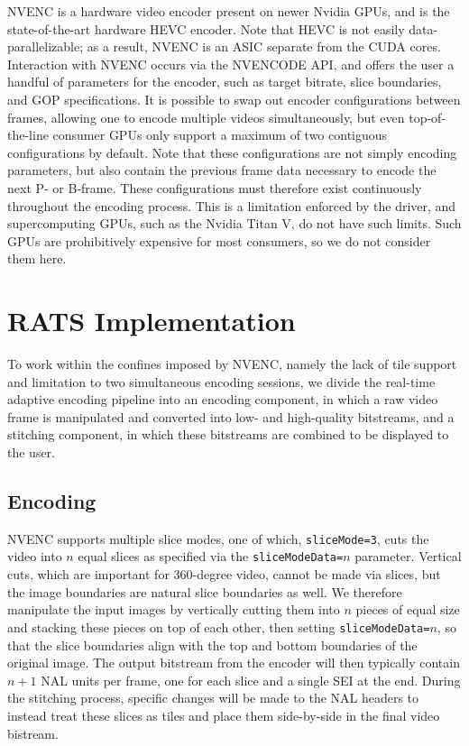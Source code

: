 NVENC is a hardware video encoder present on newer Nvidia GPUs, and is the state-of-the-art hardware HEVC encoder. Note that HEVC is not easily data-parallelizable; as a result, NVENC is an ASIC separate from the CUDA cores. Interaction with NVENC occurs via the NVENCODE API, and offers the user a handful of parameters for the encoder, such as target bitrate, slice boundaries, and GOP specifications. It is possible to swap out encoder configurations between frames, allowing one to encode multiple videos simultaneously, but even top-of-the-line consumer GPUs only support a maximum of two contiguous configurations by default. Note that these configurations are not simply encoding parameters, but also contain the previous frame data necessary to encode the next P- or B-frame. These configurations must therefore exist continuously throughout the encoding process. This is a limitation enforced by the driver, and supercomputing GPUs, such as the Nvidia Titan V, do not have such limits. Such GPUs are prohibitively expensive for most consumers, so we do not consider them here.

\section{RATS Implementation}
To work within the confines imposed by NVENC, namely the lack of tile support and limitation to two simultaneous encoding sessions, we divide the real-time adaptive encoding pipeline into an encoding component, in which a raw video frame is manipulated and converted into low- and high-quality bitstreams, and a stitching component, in which these bitstreams are combined to be displayed to the user.

\subsection{Encoding}
NVENC supports multiple slice modes, one of which, \texttt{sliceMode=3}, cuts the video into $n$ equal slices as specified via the \texttt{sliceModeData=}$n$ parameter. Vertical cuts, which are important for 360-degree video, cannot be made via slices, but the image boundaries are natural slice boundaries as well. We therefore manipulate the input images by vertically cutting them into $n$ pieces of equal size and stacking these pieces on top of each other, then setting \texttt{sliceModeData=}$n$, so that the slice boundaries align with the top and bottom boundaries of the original image. The output bitstream from the encoder will then typically contain $n+1$ NAL units per frame, one for each slice and a single SEI at the end. During the stitching process, specific changes will be made to the NAL headers to instead treat these slices as tiles and place them side-by-side in the final video bistream.

